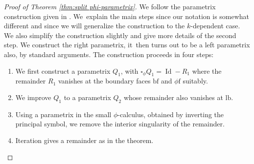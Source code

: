 \documentclass[JEP,XML,SOM,Unicode,NoFloatCountersInSection,published]{cedram}
\theoremstyle{plain}
\theoremstyle{definition}
\newcommand{\phif}{{\phi\mathrm{f}}}
\newcommand{\lf}{{\mathrm{lb}}}
\newcommand{\bbf}{{\mathrm{bf}}}
\DeclareMathOperator{\Id}{Id}
\begin{document}
\begin{proof}[Proof of Theorem \ref{thm:split phi-parametrix}]
We follow the parametrix construction given in \cite{grieser-para}. We~explain the main steps since our notation is somewhat different and since we will generalize the construction to the $k$-dependent case. We also simplify the construction slightly and give more details of the second step. We construct the right parametrix, it~then turns out to be a left parametrix also, by standard arguments. The construction proceeds in four steps:
\begin{enumerate}
\item[Step 1:] We first construct a parametrix $Q_1$, with $\square_\phi Q_1 = \Id - R_1$
where the remain\-der $R_1$ vanishes at the boundary faces $\bbf$ and $\phif$ suitably.
\item[Step 2:] We improve $Q_1$ to a parametrix $Q_2$ whose remainder also vanishes at $\lf$.
\item[Step 3:] Using a parametrix in the small $\phi$-calculus, obtained by inverting the principal symbol,
we remove the interior singularity of the remainder.
\item[Step 4:] Iteration gives a remainder as in the theorem.
\end{enumerate}


\end{proof}
\end{document}
